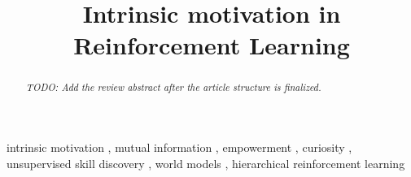 \begin{frontmatter}

\title{Intrinsic motivation in Reinforcement Learning}


\begin{abstract}
\textit{TODO: Add the review abstract after the article structure is finalized.}
\end{abstract}

\begin{keyword}
intrinsic motivation \sep
mutual information \sep
empowerment \sep
curiosity \sep
unsupervised skill discovery \sep
world models \sep
hierarchical reinforcement learning
\end{keyword}

\end{frontmatter}
